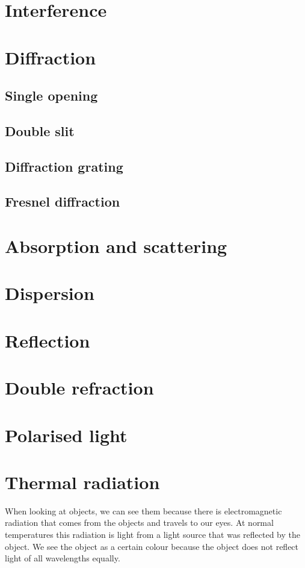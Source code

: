 \section{Interference}
\section{Diffraction}
\subsection{Single opening}
\subsection{Double slit}
\subsection{Diffraction grating}
\subsection{Fresnel diffraction}
\section{Absorption and scattering}
\section{Dispersion}
\section{Reflection}
\section{Double refraction}
\section{Polarised light}
\section{Thermal radiation}
When looking at objects, we can see them because there is electromagnetic radiation that comes from the objects and travels to our eyes. At normal temperatures this radiation is light from a light source that was reflected by the object. We see the object as a certain colour because the object does not reflect light of all wavelengths equally.
